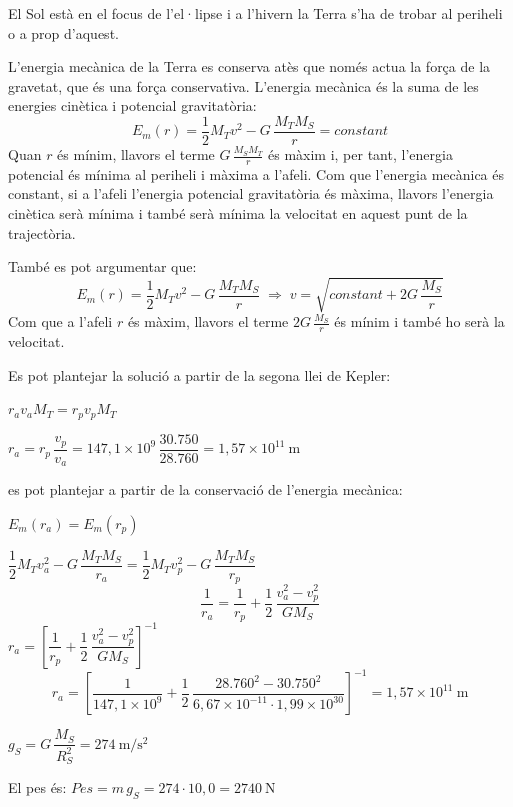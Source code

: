 \begin{solapartat}
 El Sol està en el focus de l'el·lipse i a l'hivern la Terra s'ha de trobar al periheli o a prop d'aquest.

 L'energia mecànica de la Terra es conserva atès que només actua la força de la gravetat, que és una força conservativa.
L'energia mecànica és la suma de les energies cinètica i potencial gravitatòria:
\[ E_m(r) = \frac{1}{2}M_T v^2 - G\,\frac{M_T M_S}{r} = \mathit{constant} \]
Quan $r$ és mínim, llavors el terme $G\,\frac{M_S M_T}{r}$ és màxim i, per tant, l'energia potencial és mínima al periheli i màxima a l'afeli.
Com que l'energia mecànica és constant, si a l'afeli l'energia potencial gravitatòria és màxima, llavors l'energia cinètica serà mínima i també serà mínima la velocitat en aquest punt de la trajectòria.

També es pot argumentar que:
\[ E_m(r) = \frac{1}{2}M_T v^2 - G\,\frac{M_T M_S}{r} \;\Longrightarrow\; v = \sqrt{\mathit{constant} + 2G\,\frac{M_S}{r}} \]
Com que a l'afeli $r$ és màxim, llavors el terme $2G\,\frac{M_S}{r}$ és mínim i també ho serà la velocitat.

Es pot plantejar la solució a partir de la segona llei de Kepler:

 $r_a v_a M_T = r_p v_p M_T$

 $r_a = r_p\,\dfrac{v_p}{v_a} = 147,1\times 10^{9}\,\dfrac{30.750}{28.760} = 1,57\times 10^{11}\ \mathrm{m}$

 es pot plantejar a partir de la conservació de l'energia mecànica:

 $E_m(r_a) = E_m(r_p)$

 $\dfrac{1}{2}M_T v_a^2 - G\,\dfrac{M_T M_S}{r_a} = \dfrac{1}{2}M_T v_p^2 - G\,\dfrac{M_T M_S}{r_p}$
\[ \frac{1}{r_a} = \frac{1}{r_p} + \frac{1}{2}\,\frac{v_a^2 - v_p^2}{G M_S} \]
 $r_a = \left[\dfrac{1}{r_p} + \dfrac{1}{2}\,\dfrac{v_a^2 - v_p^2}{G M_S}\right]^{-1}$
\[ r_a = \left[\frac{1}{147,1\times 10^{9}} + \frac{1}{2}\,\frac{28.760^2 - 30.750^2}{6,67\times 10^{-11}\cdot 1,99\times 10^{30}}\right]^{-1} = 1,57\times 10^{11}\ \mathrm{m} \]
\end{solapartat}

\begin{solapartat}
 $g_S = G\,\dfrac{M_S}{R_S^2} = 274\ \mathrm{m/s^2}$ \qquad {}

 El pes és: \quad $\mathit{Pes} = m\,g_S = 274\cdot 10,0 = 2740\ \mathrm{N}$ \qquad {}
\end{solapartat}
